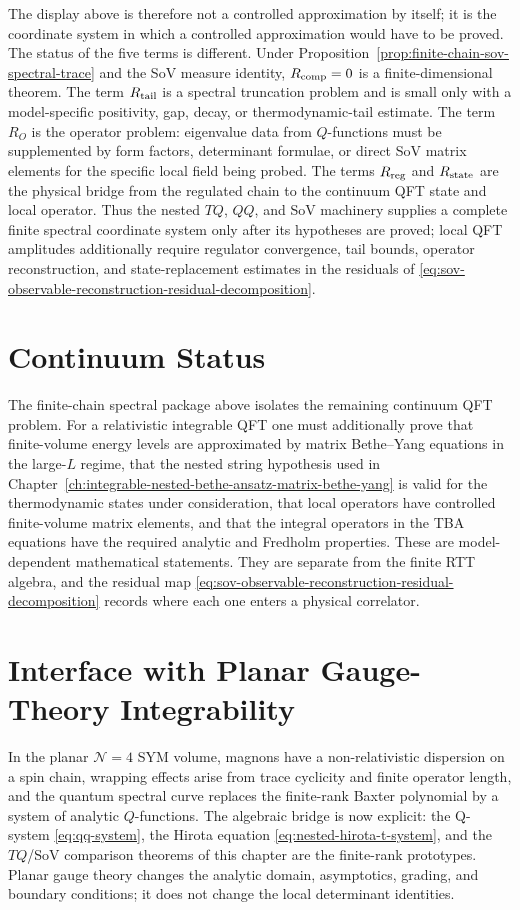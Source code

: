 The display above is therefore not a controlled approximation by itself; it is
the coordinate system in which a controlled approximation would have to be
proved.  The status of the five terms is different.  Under
Proposition~\ref{prop:finite-chain-sov-spectral-trace} and the SoV measure
identity, \(R_{\rm comp}=0\) is a finite-dimensional theorem.  The term
\(R_{\rm tail}\) is a spectral truncation problem and is small only with a
model-specific positivity, gap, decay, or thermodynamic-tail estimate.  The
term \(R_O\) is the operator problem: eigenvalue data from \(Q\)-functions
must be supplemented by form factors, determinant formulae, or direct SoV
matrix elements for the specific local field being probed.  The terms
\(R_{\rm reg}\) and \(R_{\rm state}\) are the physical bridge from the
regulated chain to the continuum QFT state and local operator.  Thus the
nested \(TQ\), \(QQ\), and SoV machinery supplies a complete finite spectral
coordinate system only after its hypotheses are proved; local QFT amplitudes
additionally require regulator convergence, tail bounds, operator
reconstruction, and state-replacement estimates in the residuals of
\eqref{eq:sov-observable-reconstruction-residual-decomposition}.

\section{Continuum Status}

The finite-chain spectral package above isolates the remaining continuum QFT
problem.  For a relativistic integrable QFT one must additionally prove that
finite-volume energy levels are approximated by matrix Bethe--Yang equations
in the large-\(L\) regime, that the nested string hypothesis used in
Chapter~\ref{ch:integrable-nested-bethe-ansatz-matrix-bethe-yang} is valid
for the thermodynamic states under consideration, that local operators have
controlled finite-volume matrix elements, and that the integral operators in
the TBA equations have the required analytic and Fredholm properties.  These
are model-dependent mathematical statements.  They are separate from the
finite RTT algebra, and the residual map
\eqref{eq:sov-observable-reconstruction-residual-decomposition} records where
each one enters a physical correlator.

\section{Interface with Planar Gauge-Theory Integrability}

In the planar \(\mathcal N=4\) SYM volume, magnons have a non-relativistic
dispersion on a spin chain, wrapping effects arise from trace cyclicity and
finite operator length, and the quantum spectral curve replaces the
finite-rank Baxter polynomial by a system of analytic \(Q\)-functions.  The
algebraic bridge is now explicit: the Q-system
\eqref{eq:qq-system}, the Hirota equation
\eqref{eq:nested-hirota-t-system}, and the \(TQ\)/SoV comparison theorems of
this chapter are the finite-rank prototypes.  Planar gauge theory changes the
analytic domain, asymptotics, grading, and boundary conditions; it does not
change the local determinant identities.
